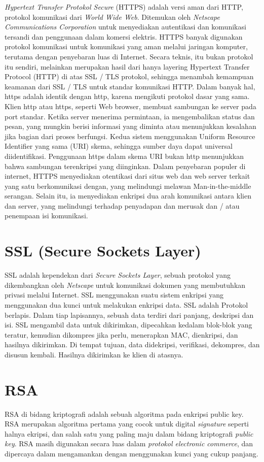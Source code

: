 \documentclass{jtetiproposalskripsi}
\begin{document}
\emph {Hypertext Transfer Protokol Secure} (HTTPS) adalah versi aman dari HTTP, protokol komunikasi dari \emph{World Wide Web}. Ditemukan oleh \emph{Netscape Communications Corporation} untuk menyediakan autentikasi dan komunikasi tersandi dan penggunaan dalam komersi elektris. HTTPS banyak digunakan protokol komunikasi untuk komunikasi yang aman melalui jaringan komputer, terutama dengan penyebaran luas di Internet. Secara teknis, itu bukan protokol itu sendiri, melainkan merupakan hasil dari hanya layering Hypertext Transfer Protocol (HTTP) di atas SSL / TLS protokol, sehingga menambah kemampuan keamanan dari SSL / TLS untuk standar komunikasi HTTP. Dalam banyak hal, https adalah identik dengan http, karena mengikuti protokol dasar yang sama. Klien http atau https, seperti Web browser, membuat sambungan ke server pada port standar. Ketika server menerima permintaan, ia mengembalikan status dan pesan, yang mungkin berisi informasi yang diminta atau menunjukkan kesalahan jika bagian dari proses berfungsi. Kedua sistem menggunakan Uniform Resource Identifier yang sama (URI) skema, sehingga sumber daya dapat universal diidentifikasi. Penggunaan https dalam skema URI bukan http menunjukkan bahwa sambungan terenkripsi yang diinginkan. Dalam penyebaran populer di internet, HTTPS menyediakan otentikasi dari situs web dan web server terkait yang satu berkomunikasi dengan, yang melindungi melawan Man-in-the-middle serangan. Selain itu, ia menyediakan enkripsi dua arah komunikasi antara klien dan server, yang melindungi terhadap penyadapan dan merusak dan / atau penempaan isi komunikasi. 

\section{SSL (Secure Sockets Layer)}
SSL adalah kependekan dari \emph{Secure Sockets Layer}, sebuah protokol yang dikembangkan oleh \emph{Netscape} untuk komunikasi dokumen yang membutuhkan privasi melalui Internet. SSL menggunakan suatu sistem enkripsi yang menggunakan dua kunci untuk melakukan enkripsi data. SSL adalah Protokol berlapis. Dalam tiap lapisannya, sebuah data terdiri dari panjang, deskripsi dan isi. SSL mengambil data untuk dikirimkan, dipecahkan kedalam blok-blok yang teratur, kemudian dikompres jika perlu, menerapkan MAC, dienkripsi, dan hasilnya dikirimkan. Di tempat tujuan, data didekripsi, verifikasi, dekompres, dan disusun kembali. Hasilnya dikirimkan ke klien di atasnya. 	

\section{RSA}
RSA di bidang kriptografi adalah sebuah algoritma pada enkripsi public key. RSA merupakan algoritma pertama yang cocok untuk digital \emph{signature} seperti halnya ekripsi, dan salah satu yang paling maju dalam bidang kriptografi \emph{public key}. RSA masih digunakan secara luas dalam \emph{protokol electronic commerce}, dan dipercaya dalam mengamankan dengan menggunakan kunci yang cukup panjang. 
\end{document}
